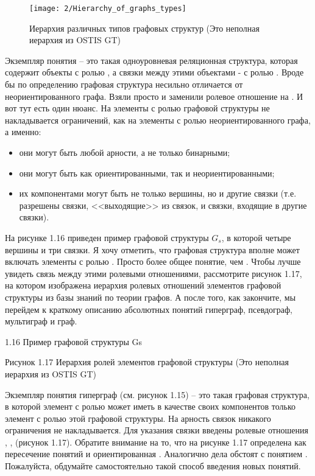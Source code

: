 \begin{figure}[h!]
  \centering
  \texttt{[image: 2/Hierarchy\_of\_graphs\_types]}
  \caption{Иерархия различных типов графовых структур (Это неполная
    иерархия из OSTIS GT)}
  \label{fig:Hierarchy_of_graphs_types}
\end{figure}

Экземпляр понятия  – это такая одноуровневая
реляционная структура, которая содержит объекты с ролью
, а связки между этими объектами - с ролью
. Вроде бы по определению графовая структура несильно
отличается от неориентированного графа. Взяли просто и заменили
ролевое отношение  на . И вот тут есть один
нюанс. На элементы с ролью  графовой структуры не
накладывается ограничений, как на элементы с ролью 
неориентированного графа, а именно:

\begin{itemize}
\item они могут быть любой арности, а не только бинарными;
\item они могут быть как ориентированными, так и неориентированными;
\item их компонентами могут быть не только вершины, но и другие связки
  (т.е. разрешены связки, <<выходящие>> из связок, и связки, входящие
  в другие связки).
\end{itemize}

На рисунке 1.16 приведен пример графовой структуры $G_s$, в которой
четыре вершины и три связки. Я хочу отметить, что графовая структура
вполне может включать элементы с ролью . Просто
 более общее понятие, чем . Чтобы лучше
увидеть связь между этими ролевыми отношениями, рассмотрите рисунок
1.17, на котором изображена иерархия ролевых отношений элементов
графовой структуры из базы знаний по теории графов. А после того, как
закончите, мы перейдем к краткому описанию абсолютных понятий
гиперграф, псевдограф, мультиграф и граф.
 
1.16 Пример графовой структуры Gs
 
Рисунок 1.17 Иерархия ролей элементов графовой структуры (Это неполная иерархия из OSTIS GT)

Экземпляр понятия гиперграф (см. рисунок 1.15) – это такая графовая
структура, в которой элемент с ролью  может иметь в
качестве своих компонентов только элемент с ролью  этой
графовой структуры.  На арность связок никакого ограничения не
накладывается. Для указания связки введены ролевые отношения
, ,  (рисунок
1.17). Обратите внимание на то, что на рисунке 1.17 
определена как пересечение понятий  и
ориентированная . Аналогично дела обстоят с понятием
. Пожалуйста, обдумайте самостоятельно такой способ
введения новых понятий.

